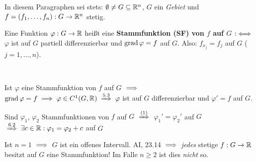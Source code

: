 \documentclass[a4paper,twoside,DIV15,BCOR12mm]{scrbook}
\begin{document}
In diesem Paragraphen sei stets: $\emptyset \ne G \subseteq \mathbb{R}^n$, $G$ ein \emph{Gebiet} und $f=(f_1,\ldots,f_n): G\to\mathbb{R}^n$ stetig.

\begin{definition}
Eine Funktion $\varphi:G\to\mathbb{R}$ heißt eine \textbf{Stammfunktion (SF) von $f$ auf $G$} $:\iff$ $\varphi$ ist auf $G$ partiell differenzierbar und $\mathop{\rm grad}\nolimits\varphi = f$ auf $G$. Also: $f_{x_j} = f_j$ auf $G$ ($j=1,\ldots,n$).
\end{definition}

\begin{bemerkung}
\ 
\vspace{-1.5em}
\begin{liste}
\item Ist $\varphi$ eine Stammfunktion von $f$ auf $G$ $\implies$ $\grad\varphi = f \folgt \varphi \in C^1(G,\MdR) \folgtnach{5.3} \varphi$ ist auf $G$ differenzierbar und $\varphi' = f$ auf $G$.
\item Sind $\varphi_1$, $\varphi_2$ Stammfunktionen von $f$ auf $G$ $\folgtnach{(1)}$ $\varphi_1'=\varphi_2'$ auf $G$ $\folgtnach{6.2} \exists c\in\MdR: \varphi_1=\varphi_2+c$ auf $G$
\item Ist $n=1$ $\implies$ $G$ ist ein offenes Intervall. AI, 23.14 $\implies$ \emph{jedes} stetige $f:G\to\mathbb{R}$ besitzt auf $G$ eine Stammfunktion! Im Falle $n\ge 2$ ist dies \emph{nicht} so.
\end{liste}
\end{bemerkung}
\end{document}
